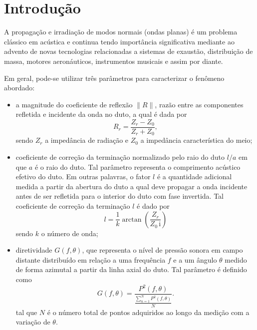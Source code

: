 \chapter{Introdução}
\label{chapter:introdcao}

A propagação e irradiação de modos normais (ondas planas) é um problema clássico em acústica e continua tendo importância significativa mediante ao advento de novas tecnologias relacionadas a sistemas de exaustão, distribuição de massa, motores aeronáuticos, instrumentos musicais e assim por diante.

Em geral, pode-se utilizar três parâmetros para caracterizar o fenômeno abordado:

\begin{itemize}
    \item a magnitude do coeficiente de reflexão $\|R\|$, razão entre as componentes refletida e incidente da onda no duto, a qual é dada por
    \begin{equation}
        R_{r} =\frac{Z_{r} - Z_{0}}{Z_{r} + Z_{0}},
        \label{eq:R}
    \end{equation}
    sendo $Z_{r}$ a impedância de radiação e $Z_{0}$ a impedância característica do meio;
    
    \item coeficiente de correção da terminação normalizado pelo raio do duto $l/a$ em que $a$ é o raio do duto. Tal parâmetro representa o comprimento acústico efetivo do duto. Em outras palavras, o fator $l$ é a quantidade adicional medida a partir da abertura do duto a qual deve propagar a onda incidente antes de ser refletida para o interior do duto com fase invertida. Tal coeficiente de correção da terminação $l$ é dado por
    \begin{equation}
        l = \frac{1}{k} \arctan\!\left(\frac{Z_{r}}{Z_{0} \, \mathrm{i}}\right)
        \label{eq:l}
    \end{equation}
    sendo $k$ o número de onda;
    
    \item diretividade $G(f,\theta)$, que representa o nível de pressão sonora em campo distante distribuído em relação a uma frequência $f$ e a um ângulo $\theta$ medido de forma azimutal a partir da linha axial do duto. Tal parâmetro é definido como
    \begin{equation}
        G(f,\theta)=\frac{P^{2}(f,\theta)}{\frac{\sum_{n = 1}^{N} P^2(f,\theta)}{N}}.
        \label{eq:directivity}
    \end{equation}
    tal que $N$ é o número total de pontos adquiridos ao longo da medição com a variação de $\theta$.
\end{itemize}

